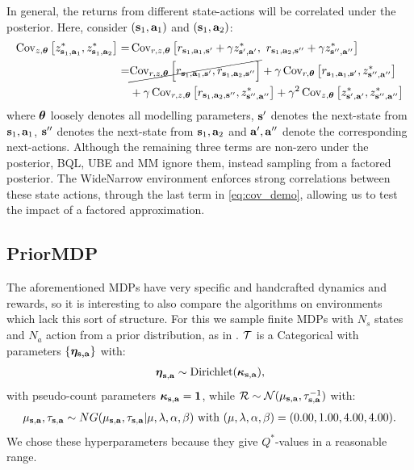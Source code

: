 \documentclass{article}
\begin{document}
\begin{appendices}
In general, the returns from different state-actions will be correlated under the posterior. Here, consider $(\mathbf{s}_1, \mathbf{a}_1)$ and $(\mathbf{s}_1, \mathbf{a}_2)$:
\begin{align}
\operatorname{\text{Cov}}_{z, \boldsymbol{\theta}} \left[  z^*_{\mathbf{s}_1, \mathbf{a}_1}, z^*_{\mathbf{s}_1, \mathbf{a}_2} \right] = &\operatorname{\text{Cov}}_{r, z, \boldsymbol{\theta}} \left[  r_{\mathbf{s}_1, \mathbf{a}_1, \mathbf{s}'} + \gamma z^*_{\mathbf{s}', \mathbf{a}'}, ~r_{\mathbf{s}_1, \mathbf{a}_2, \mathbf{s}{''}} + \gamma z^*_{\mathbf{s}{''}, \mathbf{a}{''}} \right] \label{eq:cov_demo} \\
 =& \cancel{\operatorname{\text{Cov}}_{r, z, \boldsymbol{\theta}} \Big[ r_{\mathbf{s}_1, \mathbf{a}_1, \mathbf{s}'}, r_{\mathbf{s}_1, \mathbf{a}_2, \mathbf{s}{''}}\Big]} + \gamma \operatorname{\text{Cov}}_{r, \boldsymbol{\theta}} \left[ r_{\mathbf{s}_1, \mathbf{a}_1, \mathbf{s}'} , z^*_{\mathbf{s}{''}, \mathbf{a}{''}}  \right]\nonumber \\
&+ \gamma \operatorname{\text{Cov}}_{r, z, \boldsymbol{\theta}} \left[  r_{\mathbf{s}_1, \mathbf{a}_2, \mathbf{s}{''}} , z^*_{\mathbf{s}{''}, \mathbf{a}{''}}  \right] + \gamma^2 \operatorname{\text{Cov}}_{z, \boldsymbol{\theta}} \left[ z^*_{\mathbf{s}', \mathbf{a}'},  z^*_{\mathbf{s}{''}, \mathbf{a}{''}} \right]\nonumber
\end{align}
where $\boldsymbol{\theta}$ loosely denotes all modelling parameters, $\mathbf{s}'$ denotes the next-state from $\mathbf{s}_1, \mathbf{a}_1$, $\mathbf{s}{''}$ denotes the next-state from $\mathbf{s}_1, \mathbf{a}_2$ and $\mathbf{a}{'}, \mathbf{a}{''}$ denote the corresponding next-actions. Although the remaining three terms are non-zero under the posterior, BQL, UBE and MM ignore them, instead sampling from a factored posterior. The WideNarrow environment enforces strong correlations between these state actions, through the last term in \cref{eq:cov_demo}, allowing us to test the impact of a factored approximation.

\subsection{PriorMDP}

The aforementioned MDPs have very specific and handcrafted dynamics and rewards, so it is interesting to also compare the algorithms on environments which lack this sort of structure. For this we sample finite MDPs with $N_s$ states and $N_a$ action from a prior distribution, as in \cite{psrl}. $\mathcal{T}$ is a Categorical with parameters $\{\boldsymbol{\eta_{\mathbf{s}, \mathbf{a}}}\}$ with:
\begin{align*}
\boldsymbol{\eta}_{\mathbf{s}, \mathbf{a}} \sim \text{Dirichlet}(\boldsymbol{\kappa}_{\mathbf{s}, \mathbf{a}}),
\end{align*}
with pseudo-count parameters $\boldsymbol{\kappa}_{\mathbf{s}, \mathbf{a}} = \mathbf{1}$, while $\mathcal{R} \sim \mathcal{N}(\mu_{\mathbf{s}, \mathbf{a}}, \tau_{\mathbf{s}, \mathbf{a}}^{-1})$ with:
\begin{align*}
\mu_{\mathbf{s}, \mathbf{a}}, \tau_{\mathbf{s}, \mathbf{a}} \sim NG(\mu_{\mathbf{s}, \mathbf{a}}, \tau_{\mathbf{s}, \mathbf{a}} | \mu, \lambda, \alpha, \beta) \text{ with } (\mu, \lambda, \alpha, \beta) = (0.00, 1.00, 4.00, 4.00).
\end{align*}
We chose these hyperparameters because they give $Q^*$-values in a reasonable range.


\end{appendices}
\end{document}

